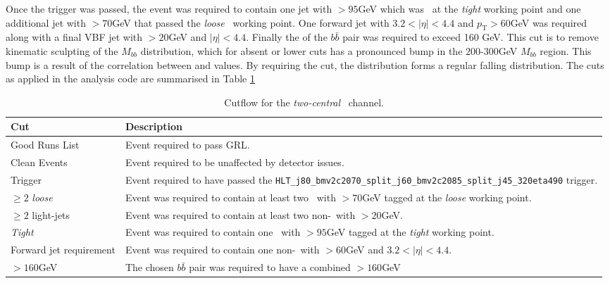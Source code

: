 		Once the trigger was passed, the event was required to contain one jet with \pt$>95$GeV which was \btagged\, at the \textit{tight} working point and one additional jet with \pt$>70$GeV that passed the \textit{loose} \btag\, working point. One forward jet with $3.2 < |\eta| < 4.4$ and $p_{\text{T}}>60$GeV was required along with a final VBF jet with \pt$>20$GeV and $|\eta| < 4.4$. Finally the \pt of the $b\bar{b}$ pair was required to exceed 160 GeV. This cut is to remove kinematic sculpting of the $M_{bb}$ distribution, which for absent or lower \ptbb cuts has a pronounced bump in the $200$-$300$GeV $M_{bb}$ region. This bump is a result of the correlation between \mbb and \ptbb values. By requiring the \ptbb cut, the \mbb distribution forms a regular falling distribution. The cuts as applied in the analysis code are summarised in Table \ref{tab:cuts}

		\begin{table}[h]
		\caption[\textit{Two-central} channel event cuts]{Cutflow for the \textit{two-central} \VBFHBB\ channel.}
		\label{tab:cuts}
		\medskip
		\centering
		\begin{tabularx}{\textwidth}{p{2.5cm} X}\toprule
			Cut & Description \\\midrule
			Good Runs List & Event required to pass GRL.\\
			Clean Events & Event required to be unaffected by detector issues.\\
			Trigger & Event required to have passed the \texttt{HLT\_j80\_bmv2c2070\_split\_\-j60\_bmv2c2085\_split\_j45\_320eta490} trigger.\\
			$\geq2$ \textit{loose} & Event was required to contain at least two \bjets\ with \pt$>70$GeV tagged at the \textit{loose} working point.\\
			$\geq2$ light-jets & Event was required to contain at least two non-\bjets\ with \pt$>20$GeV.\\
			\textit{Tight} \bjet & Event was required to contain one \bjet\ with \pt$>95$GeV tagged at the \textit{tight} working point.\\
			Forward jet requirement & Event was required to contain one non-\bjet\ with \pt$>60$GeV and $3.2 < |\eta| < 4.4$.\\
			\ptbb$>160$GeV & The chosen $b\bar{b}$ pair was required to have a combined \pt$>160$GeV \\
			\bottomrule
		\end{tabularx}
	\end{table}

